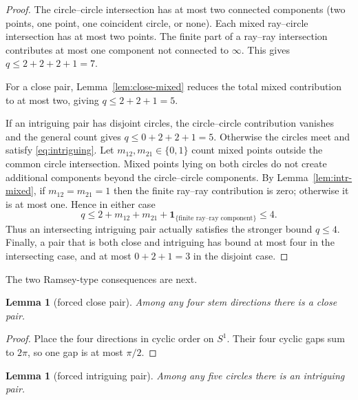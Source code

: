 \documentclass[11pt]{article}
\theoremstyle{plain}
\newtheorem{lemma}[theorem]{Lemma}
\theoremstyle{definition}
\theoremstyle{remark}
\newcommand{\1}{\mathbf 1}
\begin{document}
\begin{proof}
The circle--circle intersection has at most two connected components (two
points, one point, one coincident circle, or none).  Each mixed ray--circle
intersection has at most two points.  The finite part of a ray--ray
intersection contributes at most one component not connected to $\infty$.
This gives $q\leq2+2+2+1=7$.

For a close pair, Lemma~\ref{lem:close-mixed} reduces the total mixed
contribution to at most two, giving $q\leq2+2+1=5$.

If an intriguing pair has disjoint circles, the circle--circle contribution
vanishes and the general count gives $q\leq0+2+2+1=5$.  Otherwise the circles
meet and satisfy \eqref{eq:intriguing}.  Let $m_{12},m_{21}\in\{0,1\}$ count
mixed points outside the common circle intersection.  Mixed points lying on
both circles do not create additional components beyond the circle--circle
components.  By Lemma~\ref{lem:intr-mixed}, if
$m_{12}=m_{21}=1$ then the finite ray--ray contribution is zero; otherwise it
is at most one.  Hence in either case
\[
 q\leq2+m_{12}+m_{21}+\1_{\{\text{finite ray--ray component}\}}\leq4.
\]
Thus an intersecting intriguing pair actually satisfies the stronger bound
$q\leq4$.  Finally, a pair that is both close and intriguing has bound at
most four in the intersecting case, and at most $0+2+1=3$ in the disjoint
case.
\end{proof}

The two Ramsey-type consequences are next.

\begin{lemma}[forced close pair]\label{lem:forced-close}
Among any four stem directions there is a close pair.
\end{lemma}

\begin{proof}
Place the four directions in cyclic order on $S^1$.  Their four cyclic gaps
sum to $2\pi$, so one gap is at most $\pi/2$.
\end{proof}

\begin{lemma}[forced intriguing pair]\label{lem:forced-intriguing}
Among any five circles there is an intriguing pair.
\end{lemma}
\end{document}
